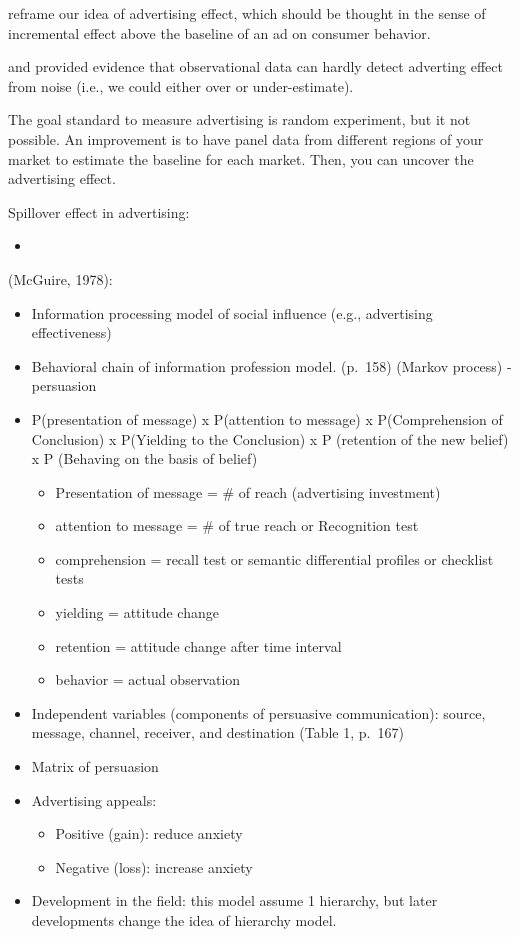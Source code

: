 \documentclass[
]{book}
\providecommand{\tightlist}{%
  \setlength{\itemsep}{0pt}\setlength{\parskip}{0pt}}
\begin{document}
\citep{Gordon_2019} reframe our idea of advertising effect, which should be thought in the sense of incremental effect above the baseline of an ad on consumer behavior.

\citep{Gordon_2017} and \citep{Lewis_2015} provided evidence that observational data can hardly detect adverting effect from noise (i.e., we could either over or under-estimate).

The goal standard to measure advertising is random experiment, but it not possible. An improvement is to have panel data from different regions of your market to estimate the baseline for each market. Then, you can uncover the advertising effect.

Spillover effect in advertising:

\begin{itemize}
\tightlist
\item
  \citep{Rutz_2011}
\end{itemize}

(McGuire, 1978):

\begin{itemize}
\item
  Information processing model of social influence (e.g., advertising effectiveness)
\item
  Behavioral chain of information profession model. (p.~158) (Markov process) - persuasion
\item
  P(presentation of message) x P(attention to message) x P(Comprehension of Conclusion) x P(Yielding to the Conclusion) x P (retention of the new belief) x P (Behaving on the basis of belief)

  \begin{itemize}
  \item
    Presentation of message = \# of reach (advertising investment)
  \item
    attention to message = \# of true reach or Recognition test
  \item
    comprehension = recall test or semantic differential profiles or checklist tests
  \item
    yielding = attitude change
  \item
    retention = attitude change after time interval
  \item
    behavior = actual observation
  \end{itemize}
\item
  Independent variables (components of persuasive communication): source, message, channel, receiver, and destination (Table 1, p.~167)
\item
  Matrix of persuasion
\item
  Advertising appeals:

  \begin{itemize}
  \item
    Positive (gain): reduce anxiety
  \item
    Negative (loss): increase anxiety
  \end{itemize}
\item
  Development in the field: this model assume 1 hierarchy, but later developments change the idea of hierarchy model.
\end{itemize}
\end{document}
